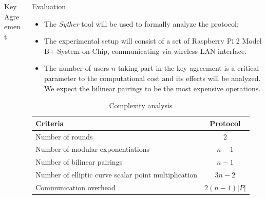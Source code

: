\documentclass[final]{beamer}
\newlength{\onecolwid}
\newlength{\twocolwid}
\begin{document}
\begin{frame}[t]
\begin{columns}[t]
\begin{column}{\twocolwid}
\begin{columns}[t,totalwidth=\twocolwid]
\begin{column}{\onecolwid}
\begin{block}{Key Agreement}
\end{block}

\end{column} %


\begin{column}{\onecolwid}\vspace{-.6in} %

\begin{block}{Evaluation}

\begin{itemize}
	\item The {\em Syther} tool will be used to formally analyze the protocol; \vspace*{0.3cm}
	\item The experimental setup will consist of a set of Raspberry Pi 2 Model B+ System-on-Chip, communicating via wireless LAN interface. \vspace*{0.3cm}
	\item The number of users $n$ taking part in the key agreement is a critical parameter to the computational cost and its effects will be analyzed. We expect the bilinear pairings to be the most expensive operations.
\end{itemize}

\vspace*{-1cm}
\begin{table}
\begin{tabular}{p{20cm} c}
\toprule
Criteria & Protocol \\
\midrule
Number of rounds & $2$ \\
Number of modular exponentiations & $n-1$ \\
Number of bilinear pairings & $n-1$ \\
Number of elliptic curve scalar point multiplication & $3n-2$ \\
Communication overhead & $2(n-1)|P|$ \\
\bottomrule
\end{tabular}
\vspace{0.1cm}
\caption{Complexity analysis}
\end{table}

\end{block}

\end{column} %


\end{columns}
\end{column}
\end{columns}
\end{frame}
\end{document}
